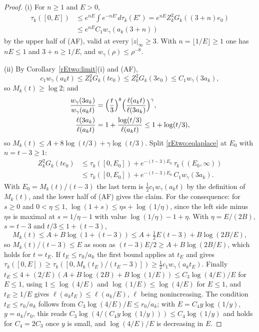 \begin{proof}
(i) For $n\ge1$ and $E>0$,
\begin{align*}
\tau_k([0,E])&\le e^{nE}\!\int\! e^{-nE'}d\tau_k(E')
=e^{nE}Z_k^2G_k((3+n)e_0)\\
&\le e^{nE}C_1w_\gamma(a_k(3+n))
\end{align*}
by the upper half of (AF), valid at every $|z|_\infty\ge3$. With
$n=\lfloor1/E\rfloor\ge1$ one has $nE\le1$ and $3+n\ge1/E$, and
$w_\gamma(\rho)\le\rho^{-8}$.

(ii) By Corollary~\ref{rEtwo:limit}(i) and (AF),
\[
c_1w_\gamma(a_kt)\le Z_k^2G_k(te_0)\le Z_k^2G_k(3e_0)\le C_1w_\gamma(3a_k),
\]
so $M_k(t)\ge\log2$; and
\begin{align*}
\frac{w_\gamma(3a_k)}{w_\gamma(a_kt)}&=\Bigl(\frac t3\Bigr)^8
\Bigl(\frac{\ell(a_kt)}{\ell(3a_k)}\Bigr)^{\gamma},\\
\frac{\ell(3a_k)}{\ell(a_kt)}&=1+\frac{\log(t/3)}{\ell(a_kt)}\le1+\log(t/3),
\end{align*}
so $M_k(t)\le A+8\log(t/3)+\gamma\log(t/3)$. Split \eqref{rEtwo:eqlaplace} at
$E_0$ with $n=t-3\ge1$:
\begin{align*}
Z_k^2G_k(te_0)&\le\tau_k([0,E_0])+e^{-(t-3)E_0}\,\tau_k((E_0,\infty))\\
&\le\tau_k([0,E_0])+e^{-(t-3)E_0}\,C_1w_\gamma(3a_k).
\end{align*}
With $E_0=M_k(t)/(t-3)$ the last term is $\tfrac12c_1w_\gamma(a_kt)$ by the
definition of $M_k(t)$, and the lower half of (AF) gives the claim. For the
consequence: for $s\ge0$ and $0<\eta\le1$, $\log(1+s)\le\eta s+\log(1/
\eta)$, since the left side minus $\eta s$ is maximal at $s=1/\eta-1$ with
value $\log(1/\eta)-1+\eta$. With $\eta=E/(2B)$, $s=t-3$ and $t/3\le1+(t-3)$,
\[
M_k(t)\le A+B\log(1+(t-3))\le A+\tfrac12E(t-3)+B\log(2B/E),
\]
so $M_k(t)/(t-3)\le E$ as soon as $(t-3)E/2\ge A+B\log(2B/E)$, which holds
for $t=t_E$. If $t_E\le r_0/a_k$ the first bound applies at $t_E$ and
gives $\tau_k([0,E])\ge\tau_k([0,M_k(t_E)/(t_E-3)])\ge\tfrac12c_1w_\gamma(
a_kt_E)$. Finally $t_E\le4+(2/E)(A+B\log(2B)+B\log(1/E))\le C_3\log(4/E)/E$
for $E\le1$, using $1\le\log(4/E)$ and $\log(1/E)\le\log(4/E)$ for $E\le1$, and
$t_E\ge1/E$ gives $\ell(a_kt_E)\le\ell(a_k/E)$, $\ell$ being nonincreasing.
The condition $t_E\le r_0/a_k$ follows from $C_3\log(4/E)/E\le r_0/a_k$;
with $E=C_4y\log(1/y)$, $y=a_k/r_0$, this reads $C_3\log(4/(C_4y\log(1/y)))
\le C_4\log(1/y)$ and holds for $C_4=2C_3$ once $y$ is small, and
$\log(4/E)/E$ is decreasing in $E$.


\end{proof}
